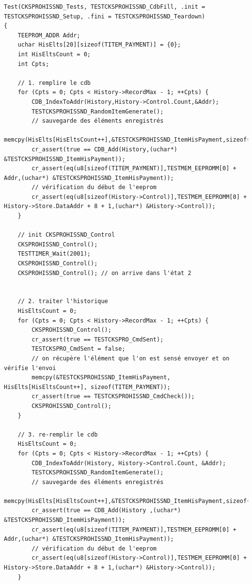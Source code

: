 \documentclass[a4paper]{article}
\begin{document}
\begin{listing}[ht!]
\begin{verbatim}
Test(CKSPROHISSND_Tests, TESTCKSPROHISSND_CdbFill, .init = TESTCKSPROHISSND_Setup, .fini = TESTCKSPROHISSND_Teardown)
{
    TEEPROM_ADDR Addr;
    uchar HisElts[20][sizeof(TITEM_PAYMENT)] = {0};
    int HisEltsCount = 0;
    int Cpts;

    // 1. remplire le cdb
    for (Cpts = 0; Cpts < History->RecordMax - 1; ++Cpts) {
        CDB_IndexToAddr(History,History->Control.Count,&Addr);
        TESTCKSPROHISSND_RandomItemGenerate();
        // sauvegarde des éléments enregistrés
        memcpy(HisElts[HisEltsCount++],&TESTCKSPROHISSND_ItemHisPayment,sizeof(TITEM_PAYMENT));
        cr_assert(true == CDB_Add(History,(uchar*) &TESTCKSPROHISSND_ItemHisPayment));
        cr_assert(eq(u8[sizeof(TITEM_PAYMENT)],TESTMEM_EEPROMM[0] + Addr,(uchar*) &TESTCKSPROHISSND_ItemHisPayment));
        // vérification du début de l'eeprom
        cr_assert(eq(u8[sizeof(History->Control)],TESTMEM_EEPROMM[0] + History->Store.DataAddr + 8 + 1,(uchar*) &History->Control));
    }

    // init CKSPROHISSND_Control
    CKSPROHISSND_Control();
    TESTTIMER_Wait(2001);
    CKSPROHISSND_Control();
    CKSPROHISSND_Control(); // on arrive dans l'état 2


    // 2. traiter l'historique
    HisEltsCount = 0;
    for (Cpts = 0; Cpts < History->RecordMax - 1; ++Cpts) {
        CKSPROHISSND_Control();
        cr_assert(true == TESTCKSPRO_CmdSent);
        TESTCKSPRO_CmdSent = false;
        // on récupère l'élément que l'on est sensé envoyer et on vérifie l'envoi
        memcpy(&TESTCKSPROHISSND_ItemHisPayment, HisElts[HisEltsCount++], sizeof(TITEM_PAYMENT));
        cr_assert(true == TESTCKSPROHISSND_CmdCheck());
        CKSPROHISSND_Control();
    }

    // 3. re-remplir le cdb
    HisEltsCount = 0;
    for (Cpts = 0; Cpts < History->RecordMax - 1; ++Cpts) {
        CDB_IndexToAddr(History, History->Control.Count, &Addr);
        TESTCKSPROHISSND_RandomItemGenerate();
        // sauvegarde des éléments enregistrés
        memcpy(HisElts[HisEltsCount++],&TESTCKSPROHISSND_ItemHisPayment,sizeof(TITEM_PAYMENT));
        cr_assert(true == CDB_Add(History ,(uchar*) &TESTCKSPROHISSND_ItemHisPayment));
        cr_assert(eq(u8[sizeof(TITEM_PAYMENT)],TESTMEM_EEPROMM[0] + Addr,(uchar*) &TESTCKSPROHISSND_ItemHisPayment));
        // vérification du début de l'eeprom
        cr_assert(eq(u8[sizeof(History->Control)],TESTMEM_EEPROMM[0] + History->Store.DataAddr + 8 + 1,(uchar*) &History->Control));
    }


\end{verbatim}
\end{listing}
\end{document}
